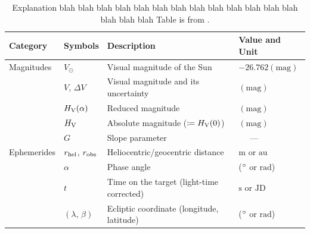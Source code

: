 \begin{table}
  \centering
  \caption[Symbols frequently used in this paper.]{Explanation blah blah blah blah blah blah blah blah blah blah blah blah blah blah blah blah Table is from \cite{2019JKAS...52...71B}.}
  \label{tab: notation}
  \setlength{\tabcolsep}{19pt}
  \begin{tabular}{llll}
    \hline\hline
    Category & Symbols & Description & Value and Unit \\  %
    \hline
    Magnitudes
     & $ V_\odot $         & Visual magnitude of the Sun           & $ -26.762 \mathrm{(mag)} $       \\
     & $ V $, $ \Delta V $ & Visual magnitude and its uncertainty  & $ \mathrm{(mag)} $ \\
     & $ H_\mathrm{V}(\alpha) $            & Reduced magnitude                     & $ \mathrm{(mag)} $ \\
     & $ H_\mathrm{V} $             & Absolute magnitude ($ \coloneqq H_\mathrm{V}(0) $) & $ \mathrm{(mag)} $ \\
     & $ G $               & Slope parameter                       & ~~ --- \\
    \hline
    Ephemerides
     & $ r_\mathrm{hel} $, $ r_\mathrm{obs} $           & Heliocentric/geocentric distance          & $ \mathrm{m} $ or $ \mathrm{au} $ \\
     & $ \alpha $                 & Phase angle                               & ($ \mathrm{^\circ} $ or $ \mathrm{rad} $) \\
     & $ t $                      & Time on the target (light-time corrected) & $ \mathrm{s} $ or $ \mathrm{JD} $ \\
     & $ (\lambda,\, \beta) $     & Ecliptic coordinate (longitude, latitude) & ($ \mathrm{^\circ} $ or $ \mathrm{rad} $) \\

\end{tabular}
\end{table}

